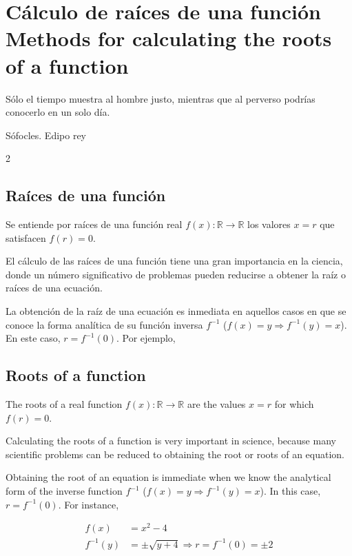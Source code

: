 \chapter{Cálculo de raíces de una función\\ Methods for calculating the roots of a function}\label{ch:raices}
\epigraph{Sólo el tiempo muestra al hombre justo, mientras que al perverso podrías conocerlo en un solo día.}{Sófocles. Edipo rey}

\sloppy
\begin{paracol}{2}
\section{Raíces de una función}
Se entiende por raíces de una función real $f(x):\mathbb{R} \rightarrow \mathbb{R}$ los valores $x=r$ que satisfacen $f(r)=0$.

El cálculo de las raíces de una función tiene una gran importancia en la ciencia, donde un número significativo de problemas pueden reducirse a obtener la raíz o raíces de una ecuación.

La obtención de la raíz de una ecuación es inmediata en aquellos casos en que se conoce la forma analítica de su función inversa $f^{-1}$ ($f(x)=y\Rightarrow f^{-1}(y)=x$). En este caso, $r=f^{-1}(0)$. Por ejemplo,
\switchcolumn
\section{Roots of a function}
The roots of a real function $f(x):\mathbb{R} \rightarrow \mathbb{R}$ are the values $x = r$ for which $f(r) = 0$.

Calculating the roots of a function is very important in science, because many scientific problems can be reduced to obtaining the root or roots of an equation.

Obtaining the root of an equation is immediate when we know the analytical form of the inverse function $f^{-1}$ ($f(x)=y\Rightarrow f^{-1}(y)=x$). In this case, $r=f^{-1}(0)$. For instance,
\end{paracol}

\begin{align*}
f(x)&=x^2-4\\
f^{-1}(y)&=\pm\sqrt{y+4}\Rightarrow r=f^{-1}(0)=\pm 2
\end{align*}

